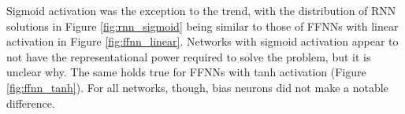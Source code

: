 \documentclass[12pt]{article}
\begin{document}
Sigmoid activation was the exception to the trend, with the distribution of RNN solutions in Figure \ref{fig:rnn_sigmoid} being similar to those of FFNNs with linear activation in Figure \ref{fig:ffnn_linear}. 
Networks with sigmoid activation appear to not have the representational power required to solve the problem, but it is unclear why. 
The same holds true for FFNNs with tanh activation (Figure \ref{fig:ffnn_tanh}). 
For all networks, though, bias neurons did not make a notable difference.\\

\begin{figure}[!tbp]
  \centering
  \hfill
  \hfill
  

\end{figure}
\end{document}
